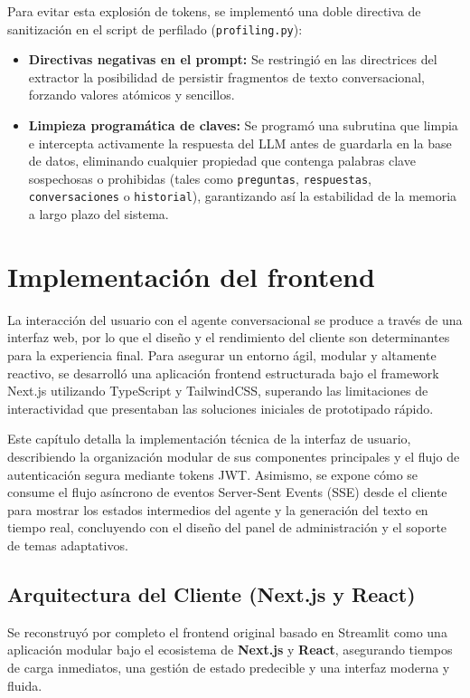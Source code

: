 \documentclass[12pt,a4paper,oneside]{report}
\begin{document}
Para evitar esta explosión de tokens, se implementó una doble directiva de sanitización en el script de perfilado (\texttt{profiling.py}):
\begin{itemize}
    \item \textbf{Directivas negativas en el prompt:} Se restringió en las directrices del extractor la posibilidad de persistir fragmentos de texto conversacional, forzando valores atómicos y sencillos.
    \item \textbf{Limpieza programática de claves:} Se programó una subrutina que limpia e intercepta activamente la respuesta del LLM antes de guardarla en la base de datos, eliminando cualquier propiedad que contenga palabras clave sospechosas o prohibidas (tales como \texttt{preguntas}, \texttt{respuestas}, \texttt{conversaciones} o \texttt{historial}), garantizando así la estabilidad de la memoria a largo plazo del sistema.
\end{itemize}

\chapter{Implementación del frontend}

La interacción del usuario con el agente conversacional se produce a través de una interfaz web, por lo que el diseño y el rendimiento del cliente son determinantes para la experiencia final. Para asegurar un entorno ágil, modular y altamente reactivo, se desarrolló una aplicación frontend estructurada bajo el framework Next.js utilizando TypeScript y TailwindCSS, superando las limitaciones de interactividad que presentaban las soluciones iniciales de prototipado rápido.

Este capítulo detalla la implementación técnica de la interfaz de usuario, describiendo la organización modular de sus componentes principales y el flujo de autenticación segura mediante tokens JWT. Asimismo, se expone cómo se consume el flujo asíncrono de eventos Server-Sent Events (SSE) desde el cliente para mostrar los estados intermedios del agente y la generación del texto en tiempo real, concluyendo con el diseño del panel de administración y el soporte de temas adaptativos.

\section{Arquitectura del Cliente (Next.js y React)}

Se reconstruyó por completo el frontend original basado en Streamlit como una aplicación modular bajo el ecosistema de \textbf{Next.js} y \textbf{React}, asegurando tiempos de carga inmediatos, una gestión de estado predecible y una interfaz moderna y fluida. 
\end{document}
